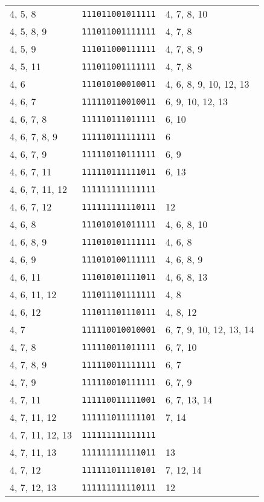 \documentclass[a4paper,12pt]{article}
\begin{document}
\begin{longtable}{l|l|l}
        4, 5, 8&\texttt{111011001011111}&4, 7, 8, 10\\
        4, 5, 8, 9&\texttt{111011001111111}&4, 7, 8\\
        4, 5, 9&\texttt{111011000111111}&4, 7, 8, 9\\
        4, 5, 11&\texttt{111011001111111}&4, 7, 8\\
        4, 6&\texttt{111010100010011}&4, 6, 8, 9, 10, 12, 13\\
        4, 6, 7&\texttt{111110110010011}&6, 9, 10, 12, 13\\
        4, 6, 7, 8&\texttt{111110111011111}&6, 10\\
        4, 6, 7, 8, 9&\texttt{111110111111111}&6\\
        4, 6, 7, 9&\texttt{111110110111111}&6, 9\\
        4, 6, 7, 11&\texttt{111110111111011}&6, 13\\
        4, 6, 7, 11, 12&\texttt{111111111111111}&\\
        4, 6, 7, 12&\texttt{111111111110111}&12\\
        4, 6, 8&\texttt{111010101011111}&4, 6, 8, 10\\
        4, 6, 8, 9&\texttt{111010101111111}&4, 6, 8\\
        4, 6, 9&\texttt{111010100111111}&4, 6, 8, 9\\
        4, 6, 11&\texttt{111010101111011}&4, 6, 8, 13\\
        4, 6, 11, 12&\texttt{111011101111111}&4, 8\\
        4, 6, 12&\texttt{111011101110111}&4, 8, 12\\
        4, 7&\texttt{111110010010001}&6, 7, 9, 10, 12, 13, 14\\
        4, 7, 8&\texttt{111110011011111}&6, 7, 10\\
        4, 7, 8, 9&\texttt{111110011111111}&6, 7\\
        4, 7, 9&\texttt{111110010111111}&6, 7, 9\\
        4, 7, 11&\texttt{111110011111001}&6, 7, 13, 14\\
        4, 7, 11, 12&\texttt{111111011111101}&7, 14\\
        4, 7, 11, 12, 13&\texttt{111111111111111}&\\
        4, 7, 11, 13&\texttt{111111111111011}&13\\
        4, 7, 12&\texttt{111111011110101}&7, 12, 14\\
        4, 7, 12, 13&\texttt{111111111110111}&12\\

\end{longtable}
\end{document}
